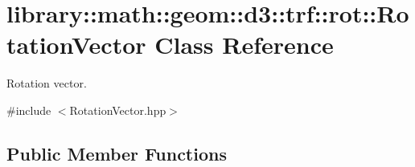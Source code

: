 \hypertarget{classlibrary_1_1math_1_1geom_1_1d3_1_1trf_1_1rot_1_1_rotation_vector}{}\section{library\+:\+:math\+:\+:geom\+:\+:d3\+:\+:trf\+:\+:rot\+:\+:Rotation\+Vector Class Reference}
\label{classlibrary_1_1math_1_1geom_1_1d3_1_1trf_1_1rot_1_1_rotation_vector}


Rotation vector.  




{\ttfamily \#include $<$Rotation\+Vector.\+hpp$>$}

\subsection*{Public Member Functions}
